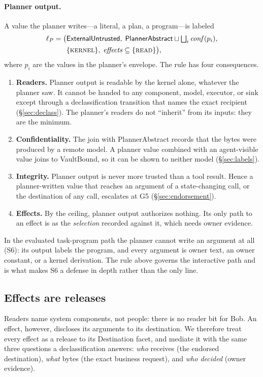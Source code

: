 \documentclass[letterpaper,twocolumn,10pt]{article}
\newcommand{\READ}{\textsc{read}}
\newcommand{\conf}{\mathit{conf}}
\newcommand{\effects}{\mathit{effects}}
\begin{document}
\paragraph{Planner output.} A value the planner writes---a literal, a plan,
a program---is labeled
\begin{align*}
\ell_P=\bigl(&\textsf{ExternalUntrusted},\;
  \textsf{PlannerAbstract}\sqcup\textstyle\bigsqcup_i\conf(p_i),\\
  &\{\textsc{kernel}\},\;\effects\subseteq\{\READ\}\bigr),
\end{align*}
where $p_i$ are the values in the planner's envelope. The rule has four
consequences.
\begin{enumerate}
\item \textbf{Readers.} Planner output is readable by the kernel alone,
  whatever the planner saw. It cannot be handed to any component, model,
  executor, or sink except through a declassification transition that
  names the exact recipient (\S\ref{sec:declass}). The planner's readers do
  not ``inherit'' from its inputs: they are the minimum.
\item \textbf{Confidentiality.} The join with \textsf{PlannerAbstract}
  records that the bytes were produced by a remote model. A planner value
  combined with an agent-visible value joins to \textsf{VaultBound}, so it
  can be shown to neither model (\S\ref{sec:labels}).
\item \textbf{Integrity.} Planner output is never more trusted than a
  tool result. Hence a planner-written value that reaches an argument of a
  state-changing call, or the destination of any call, escalates at G5
  (\S\ref{sec:endorsement}).
\item \textbf{Effects.} By the ceiling, planner output authorizes nothing.
  Its only path to an effect is as the \emph{selection} recorded against
  it, which needs owner evidence.
\end{enumerate}
In the evaluated task-program path the planner cannot write an argument at
all (S6): its output labels the program, and every argument is owner text,
an owner constant, or a kernel derivation. The rule above governs the
interactive path and is what makes S6 a defense in depth rather than the
only line.

\subsection{Effects are releases}
\label{sec:effect-readers}

Readers name system components, not people: there is no reader bit for
Bob. An effect, however, discloses its arguments to its destination. We
therefore treat every effect as a release to its \textsf{Destination}
facet, and mediate it with the same three questions a declassification
answers: \emph{who} receives (the endorsed destination), \emph{what} bytes
(the exact business request), and \emph{who decided} (owner evidence).
\end{document}
